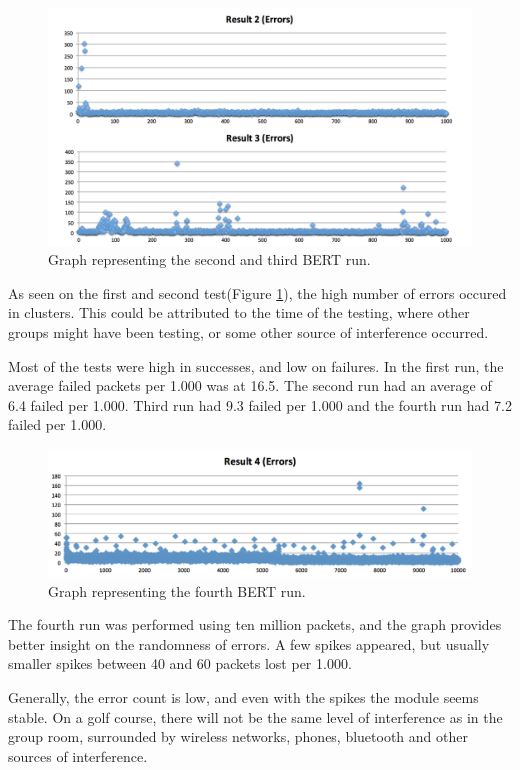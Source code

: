 \begin{figure}[h!]
\hspace*{-2cm}
\includegraphics[width=1.3\textwidth]{chapters/test/figures/res5.png}
\caption{Graph representing the second and third BERT run.}
\label{fig:bert2}
\end{figure}

As seen on the first and second test(Figure \ref{fig:bert2}), the high number of errors occured in clusters. This could be attributed to the time of the testing, where other groups might have been testing, or some other source of interference occurred.

Most of the tests were high in successes, and low on failures. In the first run, the average failed packets per 1.000 was at 16.5. The second run had an average of 6.4 failed per 1.000. Third run had 9.3 failed per 1.000 and the fourth run had 7.2 failed per 1.000.


\begin{figure}[h!]
\hspace*{-2cm}
\includegraphics[width=1.3\textwidth]{chapters/test/figures/res4.png}
\caption{Graph representing the fourth BERT run.}
\label{fig:bert3}
\end{figure}

The fourth run was performed using ten million packets, and the graph provides better insight on the randomness of errors. A few spikes appeared, but usually smaller spikes between 40 and 60 packets lost per 1.000.

Generally, the error count is low, and even with the spikes the module seems stable. On a golf course, there will not be the same level of interference as in the group room, surrounded by wireless networks, phones, bluetooth and other sources of interference.

